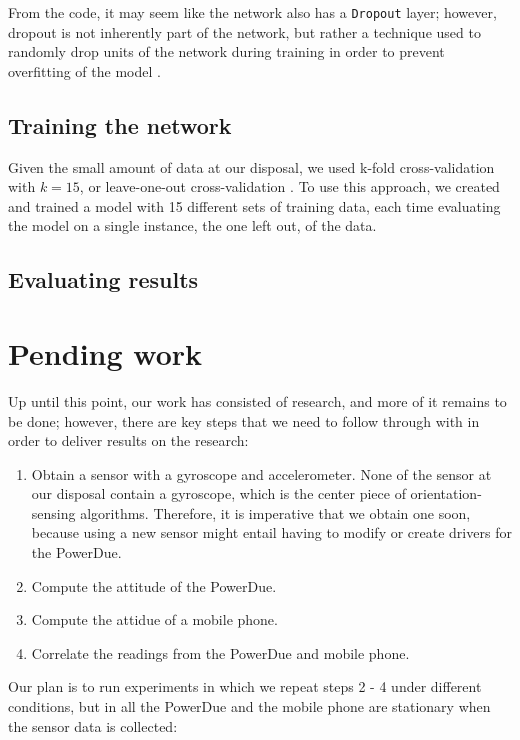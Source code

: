 \documentclass[journal]{IEEEtranTIE}
\begin{document}
From the code, it may seem like the network also has a \texttt{Dropout} layer;
however, dropout is not inherently part of the network, but rather a technique
used to randomly drop units of the network during training in order to prevent
overfitting of the model \cite{Droptout}.

\subsection{Training the network}

Given the small amount of data at our disposal, we used k-fold cross-validation
with $k=15$, or leave-one-out cross-validation \cite{StatLearn}. To use this
approach, we created and trained a model with 15 different sets of training
data, each time evaluating the model on a single instance, the one left out, of
the data.

\subsection{Evaluating results}


\section{Pending work}

Up until this point, our work has consisted of research, and more of it
remains to be done; however, there are key steps that we need to follow through
with in order to deliver results on the research:

\begin{enumerate}
\item Obtain a sensor with a gyroscope and accelerometer. None of the sensor at
      our disposal contain a gyroscope, which is the center piece of
      orientation-sensing algorithms. Therefore, it is imperative that we obtain
      one soon, because using a new sensor might entail having to modify or
      create drivers for the PowerDue.
\item Compute the attitude of the PowerDue.
\item Compute the attidue of a mobile phone.
\item Correlate the readings from the PowerDue and mobile phone.
\end{enumerate}

Our plan is to run experiments in which we repeat steps 2 - 4 under different
conditions, but in all the PowerDue and the mobile phone are stationary when the
sensor data is collected:
\end{document}

